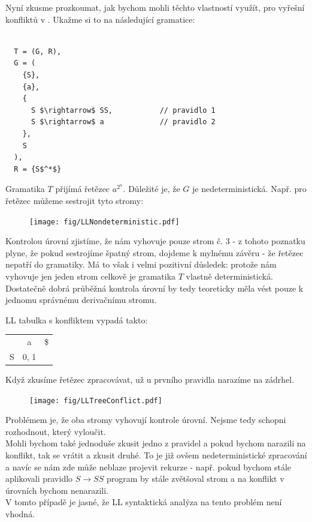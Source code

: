 Nyní zkusme prozkoumat, jak bychom mohli těchto vlastností využít, pro
vyřešní konfliktů v . Ukažme si to na následující gramatice:
\begin{exmp}
  \label{exmp:aa}
  \begin{lstlisting}

  T = (G, R),
  G = (
    {S},
    {a},
    {
      S $\rightarrow$ SS,           // pravidlo 1
      S $\rightarrow$ a             // pravidlo 2
    },
    S
  ),
  R = {S$^*$}
  \end{lstlisting}
  Gramatika $T$ přijímá řetězec $a^{2^n}$. Důležité je, že
   $G$ je
  nedeterministická. Např. pro řetězec  můžeme sestrojit
  tyto stromy:

  \begin{figure}[H]
    \centering
    \texttt{[image: fig/LLNondeterministic.pdf]}
  \end{figure}
  Kontrolou úrovní zjistíme, že nám vyhovuje pouze strom č. 3 - z tohoto
  poznatku plyne, že pokud sestrojíme špatný strom, dojdeme k mylnému závěru
  - že řetězec nepatří do gramatiky. Má to však i velmi pozitivní důsledek:
  protože nám vyhovuje jen jeden strom celkově je gramatika $T$ vlastně
  deterministická. Dostatečně dobrá průběžná kontrola úrovní by tedy teoreticky
  měla vést pouze k jednomu správnému derivačnímu stromu.

  LL tabulka s konfliktem vypadá takto:
  \begin{table}[H]
    \centering
    \begin{tabular}{| c || c | c |}
      \hline
        & a & \$  \\
      \hhline{|=||=|=|}
      S & 0, 1 &  \\
      \hline
    \end{tabular}
  \end{table}

  Když zkusíme řetězec zpracovávat, už u prvního pravidla narazíme na zádrhel.

  \begin{figure}[H]
    \centering
    \texttt{[image: fig/LLTreeConflict.pdf]}
  \end{figure}

  Problémem je, že oba stromy vyhovují kontrole úrovní.
  Nejsme tedy schopni rozhodnout, který vyloučit.\\

  Mohli bychom také jednoduše zkusit jedno z pravidel a pokud bychom narazili na
  konflikt, tak se vrátit a zkusit druhé. To je již ovšem nedeterministické
  zpracování a navíc se nám zde může neblaze projevit rekurze - např. pokud bychom
  stále aplikovali pravidlo $S \rightarrow SS$ program by stále zvětšoval strom
  a na konflikt v úrovních bychom nenarazili.\\
  V tomto případě je jasné, že LL syntaktická analýza na tento problém
  není vhodná.

\end{exmp}

